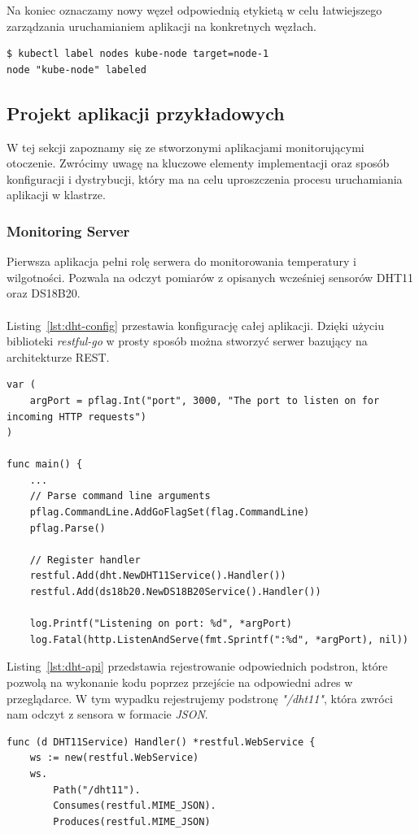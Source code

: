 \documentclass[12pt]{report}
\let\Oldsubsection\subsection
\renewcommand{\subsection}{\FloatBarrier\Oldsubsection}
\let\Oldsubsubsection\subsubsection
\renewcommand{\subsubsection}{\FloatBarrier\Oldsubsubsection}
\begin{document}
{Na koniec oznaczamy nowy węzeł odpowiednią etykietą w celu łatwiejszego zarządzania uruchamianiem aplikacji na konkretnych węzłach.

\begin{lstlisting}
$ kubectl label nodes kube-node target=node-1
node "kube-node" labeled
\end{lstlisting}

\subsection{Projekt aplikacji przykładowych}
W tej sekcji zapoznamy się ze stworzonymi aplikacjami monitorującymi otoczenie. Zwrócimy uwagę na kluczowe elementy implementacji oraz sposób konfiguracji i dystrybucji, który ma na celu uproszczenia procesu uruchamiania aplikacji w klastrze.

\subsubsection{Monitoring Server} \label{subsect:monitoring-server}
Pierwsza aplikacja pełni rolę serwera do monitorowania temperatury i wilgotności. Pozwala na odczyt pomiarów z opisanych wcześniej sensorów DHT11 oraz DS18B20. \\ \\
Listing~\ref{lst:dht-config} przestawia konfigurację całej aplikacji. Dzięki użyciu biblioteki \textit{restful-go} w prosty sposób można stworzyć serwer bazujący na architekturze REST.
\begin{lstlisting}[language=golang,caption=Konfiguracja aplikacji,label=lst:dht-config]
var (
	argPort = pflag.Int("port", 3000, "The port to listen on for incoming HTTP requests")
)

func main() {
	...
	// Parse command line arguments
	pflag.CommandLine.AddGoFlagSet(flag.CommandLine)
	pflag.Parse()

	// Register handler
	restful.Add(dht.NewDHT11Service().Handler())
	restful.Add(ds18b20.NewDS18B20Service().Handler())

	log.Printf("Listening on port: %d", *argPort)
	log.Fatal(http.ListenAndServe(fmt.Sprintf(":%d", *argPort), nil))
\end{lstlisting}

\noindent Listing~\ref{lst:dht-api} przedstawia rejestrowanie odpowiednich podstron, które pozwolą na wykonanie kodu poprzez przejście na odpowiedni adres w przeglądarce. W tym wypadku rejestrujemy podstronę \textit{"/dht11"}, która zwróci nam odczyt z sensora w formacie \textit{JSON}.
\begin{lstlisting}[language=golang,caption=Konfiguracja API,label=lst:dht-api]
func (d DHT11Service) Handler() *restful.WebService {
	ws := new(restful.WebService)
	ws.
		Path("/dht11").
		Consumes(restful.MIME_JSON).
		Produces(restful.MIME_JSON)


\end{lstlisting}}
\end{document}
